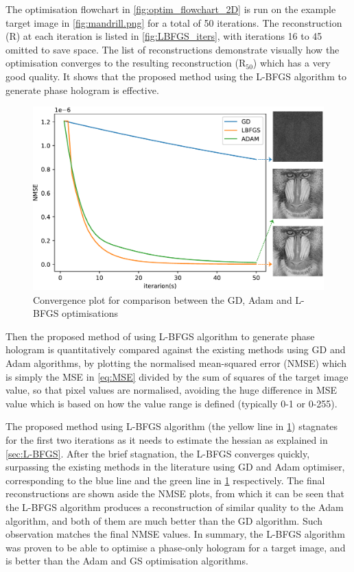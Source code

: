 The optimisation flowchart in \cref{fig:optim_flowchart_2D} is run on the example target image in \cref{fig:mandrill.png} for a total of 50 iterations. The reconstruction (R) at each iteration is listed in \cref{fig:LBFGS_iters}, with iterations 16 to 45 omitted to save space. The list of reconstructions demonstrate visually how the optimisation converges to the resulting reconstruction (R$_{50}$) which has a very good quality. It shows that the proposed method using the L-BFGS algorithm to generate phase hologram is effective.

\begin{figure}[H]
	\centering
	\includegraphics[width=\textwidth]{GD_ADAM_LBFGS.pdf}
	\caption{Convergence plot for comparison between the GD, Adam and L-BFGS optimisations}
	\label{fig:GD_ADAM_LBFGS}
\end{figure}

Then the proposed method of using L-BFGS algorithm to generate phase hologram is quantitatively compared against the existing methods using GD and Adam algorithms, by plotting the normalised mean-squared error (NMSE) which is simply the MSE in \cref{eq:MSE} divided by the sum of squares of the target image value, so that pixel values are normalised, avoiding the huge difference in MSE value which is based on how the value range is defined (typically 0-1 or 0-255).

The proposed method using L-BFGS algorithm (the yellow line in \cref{fig:GD_ADAM_LBFGS}) stagnates for the first two iterations as it needs to estimate the hessian as explained in \cref{sec:L-BFGS}. After the brief stagnation, the L-BFGS converges quickly, surpassing the existing methods in the literature using GD and Adam optimiser, corresponding to the blue line and the green line in \cref{fig:GD_ADAM_LBFGS} respectively. The final reconstructions are shown aside the NMSE plots, from which it can be seen that the L-BFGS algorithm produces a reconstruction of similar quality to the Adam algorithm, and both of them are much better than the GD algorithm. Such observation matches the final NMSE values. In summary, the L-BFGS algorithm was proven to be able to optimise a phase-only hologram for a target image, and is better than the Adam and GS optimisation algorithms.



